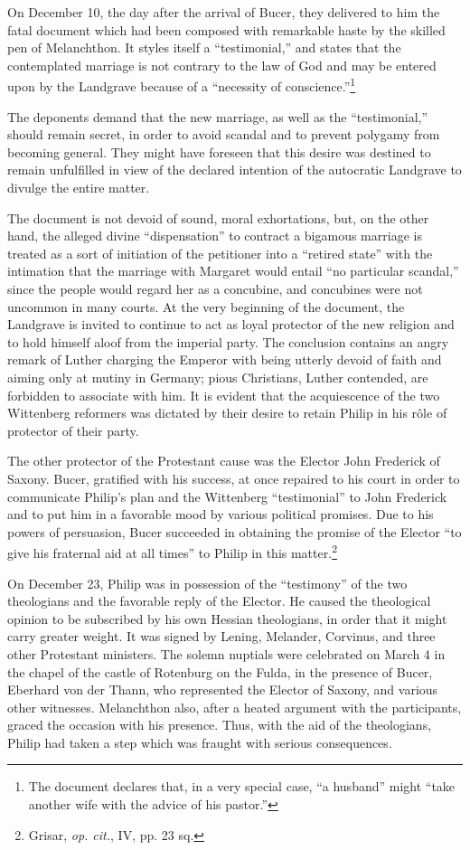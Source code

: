 On December 10, the day after the arrival of Bucer, they delivered
to him the fatal document which had been composed with remarkable haste
by the skilled pen of Melanchthon. It styles itself a “testimonial,” and
states that the contemplated marriage is not contrary to
the law of God and may be entered upon by the Landgrave because of
a “necessity of conscience.”\footnote
{The document declares that, in a very special case, “a husband” might ``take another
wife with the advice of his pastor.''}

The deponents demand that the new
marriage, as well as the “testimonial,” should remain secret, in order
to avoid scandal and to prevent polygamy from becoming general.
They might have foreseen that this desire was destined to remain unfulfilled
in view of the declared intention of the autocratic Landgrave
to divulge the entire matter.

The document is not devoid of sound, moral exhortations, but, on the
other hand, the alleged divine “dispensation” to contract a bigamous marriage
is treated as a sort of initiation of the petitioner into a “retired state”
with the intimation that the marriage with Margaret would entail “no particular
scandal,” since the people would regard her as a concubine, and
concubines were not uncommon in many courts. At the very beginning of
the document, the Landgrave is invited to continue to act as loyal protector
of the new religion and to hold himself aloof from the imperial party. The
conclusion contains an angry remark of Luther charging the Emperor with
being utterly devoid of faith and aiming only at mutiny in Germany; pious
Christians, Luther contended, are forbidden to associate with him.
It is evident that the acquiescence of the two Wittenberg reformers was
dictated by their desire to retain Philip in his rôle of protector of their party.

The other protector of the Protestant cause was the Elector John
Frederick of Saxony. Bucer, gratified with his success, at once repaired
to his court in order to communicate Philip’s plan and the
Wittenberg ``testimonial'' to John Frederick and to put him in a
favorable mood by various political promises. Due to his powers of
persuasion, Bucer succeeded in obtaining the promise of the Elector
“to give his fraternal aid at all times” to Philip in this matter.\footnote{Grisar, \textit{op. cit.}, IV, pp. 23 sq.}

On December 23, Philip was in possession of the “testimony” of
the two theologians and the favorable reply of the Elector. He caused
the theological opinion to be subscribed by his own Hessian theologians,
in order that it might carry greater weight. It was signed by
Lening, Melander, Corvinus, and three other Protestant ministers. The
solemn nuptials were celebrated on March 4 in the chapel of the castle
of Rotenburg on the Fulda, in the presence of Bucer, Eberhard
von der Thann, who represented the Elector of Saxony, and various
other witnesses. Melanchthon also, after a heated argument with the
participants, graced the occasion with his presence. Thus, with the
aid of the theologians, Philip had taken a step which was fraught
with serious consequences.


